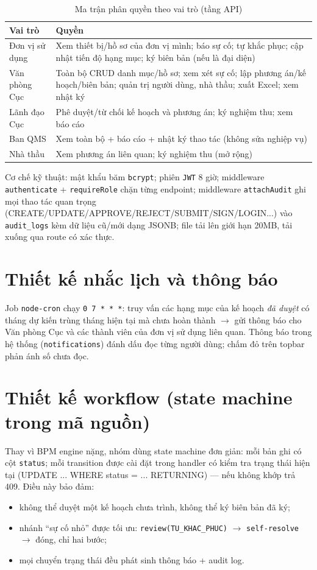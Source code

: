 \begin{table}[h]
\centering
\caption{Ma trận phân quyền theo vai trò (tầng API)}
\label{tab:roles}
\begin{tabular}{P{4.4cm}P{10.6cm}}
\toprule
\textbf{Vai trò} & \textbf{Quyền} \\
\midrule
Đơn vị sử dụng & Xem thiết bị/hồ sơ của đơn vị mình; báo sự cố; tự khắc phục; cập nhật tiến độ hạng mục; ký biên bản (nếu là đại diện) \\
Văn phòng Cục & Toàn bộ CRUD danh mục/hồ sơ; xem xét sự cố; lập phương án/kế hoạch/biên bản; quản trị người dùng, nhà thầu; xuất Excel; xem nhật ký \\
Lãnh đạo Cục & Phê duyệt/từ chối kế hoạch và phương án; ký nghiệm thu; xem báo cáo \\
Ban QMS & Xem toàn bộ + báo cáo + nhật ký thao tác (không sửa nghiệp vụ) \\
Nhà thầu & Xem phương án liên quan; ký nghiệm thu (mở rộng) \\
\bottomrule
\end{tabular}
\end{table}

Cơ chế kỹ thuật: mật khẩu băm \texttt{bcrypt}; phiên \texttt{JWT} 8 giờ; middleware \texttt{authenticate} + \texttt{requireRole} chặn từng endpoint; middleware \texttt{attachAudit} ghi mọi thao tác quan trọng (CREATE/UPDATE/APPROVE/REJECT/SUBMIT/SIGN/LOGIN...) vào \texttt{audit\_logs} kèm dữ liệu cũ/mới dạng JSONB; file tải lên giới hạn 20MB, tải xuống qua route có xác thực.

\section{Thiết kế nhắc lịch và thông báo}

Job \texttt{node-cron} chạy \texttt{0 7 * * *}: truy vấn các hạng mục của kế hoạch \emph{đã duyệt} có tháng dự kiến trùng tháng hiện tại mà chưa hoàn thành $\rightarrow$ gửi thông báo cho Văn phòng Cục và các thành viên của đơn vị sử dụng liên quan. Thông báo trong hệ thống (\texttt{notifications}) đánh dấu đọc từng người dùng; chấm đỏ trên topbar phản ánh số chưa đọc.

\section{Thiết kế workflow (state machine trong mã nguồn)}

Thay vì BPM engine nặng, nhóm dùng state machine đơn giản: mỗi bản ghi có cột \texttt{status}; mỗi transition được cài đặt trong handler có kiểm tra trạng thái hiện tại (UPDATE ... WHERE status = ... RETURNING) — nếu không khớp trả 409. Điều này bảo đảm:
\begin{itemize}
  \item không thể duyệt một kế hoạch chưa trình, không thể ký biên bản đã ký;
  \item nhánh ``sự cố nhỏ'' được tối ưu: \texttt{review(TU\_KHAC\_PHUC)} $\rightarrow$ \texttt{self-resolve} $\rightarrow$ đóng, chỉ hai bước;
  \item mọi chuyển trạng thái đều phát sinh thông báo + audit log.
\end{itemize}

